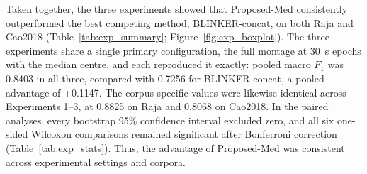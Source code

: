Taken together, the three experiments showed that Proposed-Med consistently outperformed the best competing method, BLINKER-concat, on both Raja and Cao2018 (Table~\ref{tab:exp_summary}; Figure~\ref{fig:exp_boxplot}). The three experiments share a single primary configuration, the full montage at 30~s epochs with the median centre, and each reproduced it exactly: pooled macro $F_1$ was 0.8403 in all three, compared with 0.7256 for BLINKER-concat, a pooled advantage of +0.1147. The corpus-specific values were likewise identical across Experiments 1--3, at 0.8825 on Raja and 0.8068 on Cao2018. In the paired analyses, every bootstrap 95\% confidence interval excluded zero, and all six one-sided Wilcoxon comparisons remained significant after Bonferroni correction (Table~\ref{tab:exp_stats}). Thus, the advantage of Proposed-Med was consistent across experimental settings and corpora.
